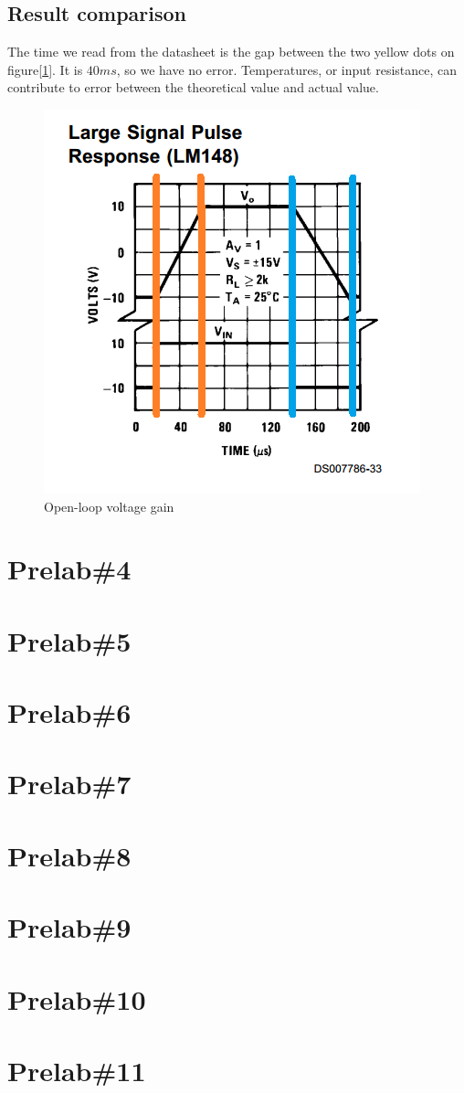 \documentclass{IEEEtran}
\begin{document}
	\subsection{Result comparison}
	The time we read from the datasheet is the gap between the two yellow dots on figure[\ref{fig:301}]. It is $40\si{ms}$, so we have no error. Temperatures, or input resistance, can contribute to error between the theoretical value and actual value.
	\begin{figure}[!htbp]
		\centering
		\begin{framed}
			\includegraphics[width=\linewidth]{images/3_1.PNG}
			\caption{Open-loop voltage gain}
		\end{framed}
		\label{fig:301}
	\end{figure}
	
	\section{\textbf{Prelab\#4}}
	\section{\textbf{Prelab\#5}}
	\section{\textbf{Prelab\#6}}
	\section{\textbf{Prelab\#7}}
	\section{\textbf{Prelab\#8}}
	\section{\textbf{Prelab\#9}}
	\section{\textbf{Prelab\#10}}
	\section{\textbf{Prelab\#11}}
\end{document}
